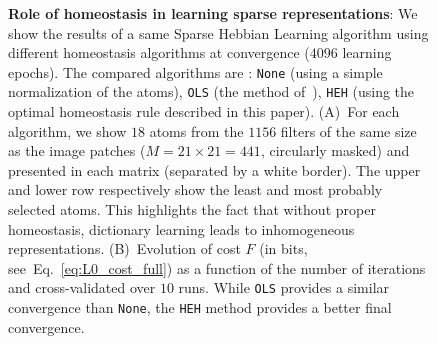 \documentclass[vision,article,submit,oneauthor,pdftex]{Definitions/mdpi}
\newcommand{\seeEq}[1]{Eq.~\ref{eq:#1}}%
\begin{document}
\begin{figure}%
\caption{
{\bf Role of homeostasis in learning sparse representations}:
We show the results of a same Sparse Hebbian Learning algorithm using different homeostasis algorithms at convergence ($4096$ learning epochs). The compared algorithms are : \texttt{None} (using a simple normalization of the atoms), \texttt{OLS} (the method of~\citep{Olshausen97}), \texttt{HEH} (using the optimal homeostasis rule described in this paper). {\sf (A)}~For each algorithm, we show $18$ atoms from the $1156$ filters of the same size as the image patches ($M= 21 \times 21=441$, circularly masked) and presented in each matrix (separated by a white border). The upper and lower row respectively show the least and most probably selected atoms. This highlights the fact that without proper homeostasis, dictionary learning leads to inhomogeneous representations. {\sf (B)}~Evolution of cost  $F$ (in bits, see~\seeEq{L0_cost_full}) as a function of the number of iterations and cross-validated over $10$ runs. While \texttt{OLS} provides a similar convergence than \texttt{None}, the \texttt{HEH} method provides a better final convergence. %
\label{fig:map}}%
\end{figure}%
\end{document}
